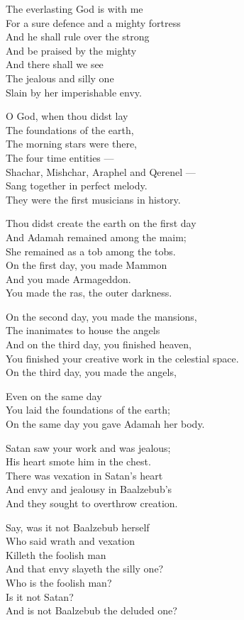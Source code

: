 \documentclass[
]{book}
\begin{document}
The everlasting God is with me\\
For a sure defence and a mighty fortress\\
And he shall rule over the strong\\
And be praised by the mighty\\
And there shall we see\\
The jealous and silly one\\
Slain by her imperishable envy.

O God, when thou didst lay\\
The foundations of the earth,\\
The morning stars were there,\\
The four time entities ---\\
Shachar, Mishchar, Araphel and Qerenel ---\\
Sang together in perfect melody.\\
They were the first musicians in history.

Thou didst create the earth on the first day\\
And Adamah remained among the maim;\\
She remained as a tob among the tobs.\\
On the first day, you made Mammon\\
And you made Armageddon.\\
You made the ras, the outer darkness.

On the second day, you made the mansions,\\
The inanimates to house the angels\\
And on the third day, you finished heaven,\\
You finished your creative work in the celestial space.\\
On the third day, you made the angels,

Even on the same day\\
You laid the foundations of the earth;\\
On the same day you gave Adamah her body.

Satan saw your work and was jealous;\\
His heart smote him in the chest.\\
There was vexation in Satan's heart\\
And envy and jealousy in Baalzebub's\\
And they sought to overthrow creation.

Say, was it not Baalzebub herself\\
Who said wrath and vexation\\
Killeth the foolish man\\
And that envy slayeth the silly one?\\
Who is the foolish man?\\
Is it not Satan?\\
And is not Baalzebub the deluded one?
\end{document}
